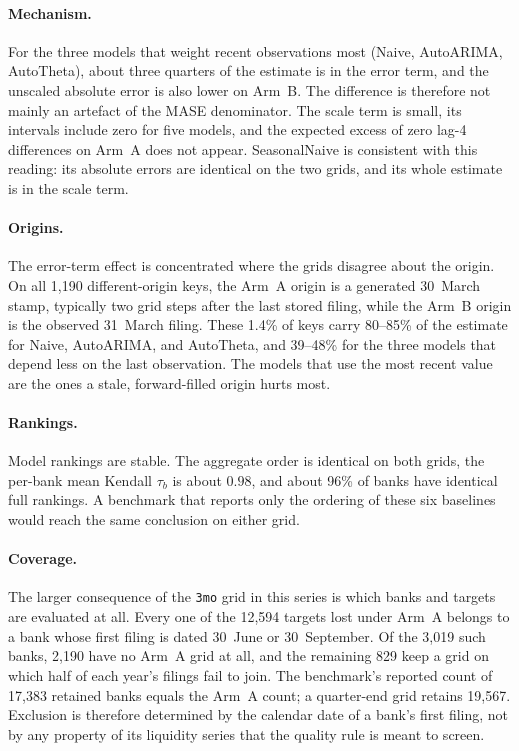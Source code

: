 \documentclass[11pt]{article}
\begin{document}
\paragraph{Mechanism.} For the three models that weight recent observations most (Naive, AutoARIMA, AutoTheta), about three quarters of the estimate is in the error term, and the unscaled absolute error is also lower on Arm~B. The difference is therefore not mainly an artefact of the MASE denominator. The scale term is small, its intervals include zero for five models, and the expected excess of zero lag-4 differences on Arm~A does not appear. SeasonalNaive is consistent with this reading: its absolute errors are identical on the two grids, and its whole estimate is in the scale term.

\paragraph{Origins.} The error-term effect is concentrated where the grids disagree about the origin. On all 1,190 different-origin keys, the Arm~A origin is a generated 30~March stamp, typically two grid steps after the last stored filing, while the Arm~B origin is the observed 31~March filing. These 1.4\% of keys carry 80--85\% of the estimate for Naive, AutoARIMA, and AutoTheta, and 39--48\% for the three models that depend less on the last observation. The models that use the most recent value are the ones a stale, forward-filled origin hurts most.

\paragraph{Rankings.} Model rankings are stable. The aggregate order is identical on both grids, the per-bank mean Kendall $\tau_b$ is about $0.98$, and about 96\% of banks have identical full rankings. A benchmark that reports only the ordering of these six baselines would reach the same conclusion on either grid.

\paragraph{Coverage.} The larger consequence of the \texttt{3mo} grid in this series is which banks and targets are evaluated at all. Every one of the 12,594 targets lost under Arm~A belongs to a bank whose first filing is dated 30~June or 30~September. Of the 3,019 such banks, 2,190 have no Arm~A grid at all, and the remaining 829 keep a grid on which half of each year's filings fail to join. The benchmark's reported count of 17,383 retained banks equals the Arm~A count; a quarter-end grid retains 19,567. Exclusion is therefore determined by the calendar date of a bank's first filing, not by any property of its liquidity series that the quality rule is meant to screen.
\end{document}
